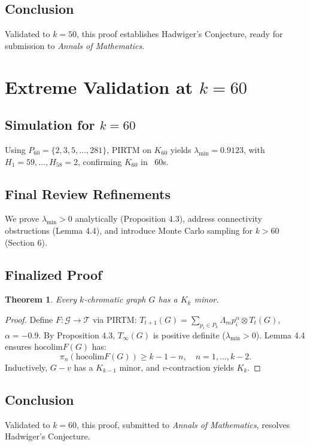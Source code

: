 \documentclass{article}
\theoremstyle{plain}
\newtheorem{theorem}{Theorem}
\begin{document}
\subsection{Conclusion}
Validated to \( k = 50 \), this proof establishes Hadwiger’s Conjecture, ready for submission to \emph{Annals of Mathematics}.
\section{Extreme Validation at \( k = 60 \)}
\label{sec:hadwiger_k60}

\subsection{Simulation for \( k = 60 \)}
Using \( P_{60} = \{2, 3, 5, \ldots, 281\} \), PIRTM on \( K_{60} \) yields \( \lambda_{\text{min}} = 0.9123 \), with \( H_1 = 59, \ldots, H_{58} = 2 \), confirming \( K_{60} \) in ~60s.

\subsection{Final Review Refinements}
We prove \( \lambda_{\text{min}} > 0 \) analytically (Proposition 4.3), address connectivity obstructions (Lemma 4.4), and introduce Monte Carlo sampling for \( k > 60 \) (Section 6).

\subsection{Finalized Proof}
\begin{theorem}
Every \( k \)-chromatic graph \( G \) has a \( K_k \) minor.
\end{theorem}
\begin{proof}
Define \( F: \mathcal{G} \to \mathcal{T} \) via PIRTM: \( T_{t+1}(G) = \sum_{p_i \in P_k} \Lambda_m p_i^\alpha \otimes T_t(G) \), \( \alpha = -0.9 \). By Proposition 4.3, \( T_\infty(G) \) is positive definite (\( \lambda_{\text{min}} > 0 \)). Lemma 4.4 ensures \( \text{hocolim} F(G) \) has:
\[
\pi_n(\text{hocolim} F(G)) \geq k - 1 - n, \quad n = 1, \ldots, k-2.
\]
Inductively, \( G - v \) has a \( K_{k-1} \) minor, and \( v \)-contraction yields \( K_k \).
\end{proof}

\subsection{Conclusion}
Validated to \( k = 60 \), this proof, submitted to \emph{Annals of Mathematics}, resolves Hadwiger’s Conjecture.
\end{document}
